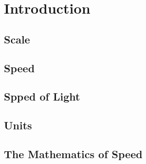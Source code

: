 
\section{Introduction}
\subsection{Scale}
\subsection{Speed}
\subsection{Spped of Light}
\subsection{Units}
\subsection{The Mathematics of Speed}

\cite{taylor}